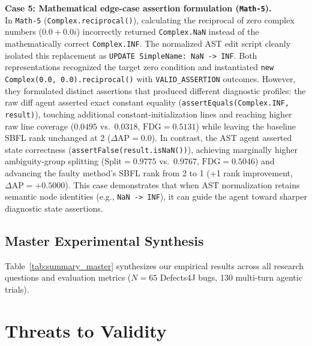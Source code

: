 \documentclass[12pt, a4paper]{article}
\begin{document}
\textbf{Case 5: Mathematical edge-case assertion formulation (\texttt{Math-5}).}\\
In \texttt{Math-5} (\texttt{Complex.reciprocal()}), calculating the reciprocal of zero complex numbers ($0.0 + 0.0i$) incorrectly returned \texttt{Complex.NaN} instead of the mathematically correct \texttt{Complex.INF}.
The normalized AST edit script cleanly isolated this replacement as \texttt{UPDATE SimpleName: NaN -> INF}.
Both representations recognized the target zero condition and instantiated \texttt{new Complex(0.0, 0.0).reciprocal()} with \texttt{VALID\_ASSERTION} outcomes.
However, they formulated distinct assertions that produced different diagnostic profiles:
the raw diff agent asserted exact constant equality (\texttt{assertEquals(Complex.INF, result)}), touching additional constant-initialization lines and reaching higher raw line coverage ($0.0495$ vs.\ $0.0318$, $\text{FDG} = 0.5131$) while leaving the baseline SBFL rank unchanged at 2 ($\Delta\text{AP} = 0.0$).
In contrast, the AST agent asserted state correctness (\texttt{assertFalse(result.isNaN())}), achieving marginally higher ambiguity-group splitting ($\text{Split} = 0.9775$ vs.\ $0.9767$, $\text{FDG} = 0.5046$) and advancing the faulty method's SBFL rank from 2 to 1 (+1 rank improvement, $\Delta\text{AP} = +0.5000$).
This case demonstrates that when AST normalization retains semantic node identities (e.g., \texttt{NaN -> INF}), it can guide the agent toward sharper diagnostic state assertions.

\subsection{Master Experimental Synthesis}\label{sec:summary_master}

Table~\ref{tab:summary_master} synthesizes our empirical results across all research questions and evaluation metrics ($N=65$ Defects4J bugs, 130 multi-turn agentic trials).



\section{Threats to Validity}\label{sec:threats}
\end{document}
